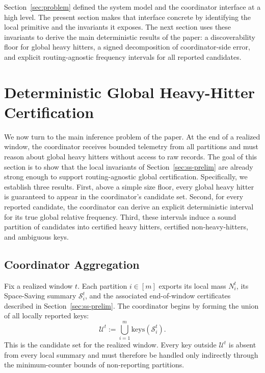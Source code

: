 \documentclass[sigconf, nonacm]{acmart}
\begin{document}
Section~\ref{sec:problem} defined the system model and the coordinator interface at a high level. The present section makes that interface concrete by identifying the local primitive and the invariants it exposes. The next section uses these invariants to derive the main deterministic results of the paper: a discoverability floor for global heavy hitters, a signed decomposition of coordinator-side error, and explicit routing-agnostic frequency intervals for all reported candidates.

\section{Deterministic Global Heavy-Hitter Certification}
\label{sec:deterministic}

We now turn to the main inference problem of the paper. At the end of a realized window, the coordinator receives bounded telemetry from all partitions and must reason about global heavy hitters without access to raw records. The goal of this section is to show that the local invariants of Section~\ref{sec:ss-prelim} are already strong enough to support routing-agnostic global certification. Specifically, we establish three results. First, above a simple size floor, every global heavy hitter is guaranteed to appear in the coordinator's candidate set. Second, for every reported candidate, the coordinator can derive an explicit deterministic interval for its true global relative frequency. Third, these intervals induce a sound partition of candidates into certified heavy hitters, certified non-heavy-hitters, and ambiguous keys.

\subsection{Coordinator Aggregation}
\label{subsec:coord-aggregation}

Fix a realized window \(t\). Each partition \(i \in [m]\) exports its local mass \(N_i^t\), its Space-Saving summary \(\mathcal S_i^t\), and the associated end-of-window certificates described in Section~\ref{sec:ss-prelim}. The coordinator begins by forming the union of all locally reported keys:
\[
\mathcal U^t
:=
\bigcup_{i=1}^m \mathrm{keys}(\mathcal S_i^t).
\]
This is the candidate set for the realized window. Every key outside \(\mathcal U^t\) is absent from every local summary and must therefore be handled only indirectly through the minimum-counter bounds of non-reporting partitions.
\end{document}
